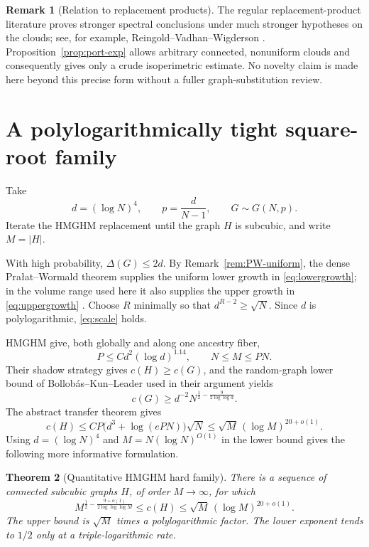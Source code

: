 \documentclass[11pt]{amsart}
\newtheorem{theorem}{Theorem}[section]
\theoremstyle{definition}
\newtheorem{remark}[theorem]{Remark}
\newcommand{\cnum}{c}
\begin{document}
\begin{remark}[Relation to replacement products]
The regular replacement-product literature proves stronger spectral
conclusions under much stronger hypotheses on the clouds; see, for example,
Reingold--Vadhan--Wigderson \cite{RVW}.  Proposition~\ref{prop:port-exp} allows arbitrary
connected, nonuniform clouds and consequently gives only a crude
isoperimetric estimate.  No novelty claim is made here beyond this precise
form without a fuller graph-substitution review.
\end{remark}

\section{A polylogarithmically tight square-root family}

Take
\[
 d=(\log N)^4,
 \qquad
 p=\frac{d}{N-1},
 \qquad
 G\sim G(N,p).
\]
Iterate the HMGHM replacement until the graph $H$ is subcubic, and write
$M=|H|$.

With high probability, $\Delta(G)\le2d$.  By
Remark~\ref{rem:PW-uniform}, the dense Pra{\l}at--Wormald theorem supplies the
uniform lower growth in \eqref{eq:lowergrowth}; in the volume range used here
it also supplies the upper growth in \eqref{eq:uppergrowth} \cite{PW}.  Choose
$R$ minimally so that $d^{R-2}\ge\sqrt N$.  Since $d$ is polylogarithmic,
\eqref{eq:scale} holds.

HMGHM give, both globally and along one ancestry fiber,
\begin{equation}\label{eq:Pbound}
 P\le C d^2(\log d)^{1.14},
 \qquad
 N\le M\le PN.
\end{equation}
Their shadow strategy gives $\cnum(H)\ge\cnum(G)$, and the random-graph lower
bound of Bollob\'as--Kun--Leader used in their argument yields
\[
 \cnum(G)
 \ge
 d^{-2}N^{\frac12-\frac{9}{2\log\log d}}.
\]
The abstract transfer theorem gives
\[
 \cnum(H)
 \le
 CP\bigl(d^3+\log(ePN)\bigr)\sqrt N
 \le
 \sqrt M\,(\log M)^{20+o(1)}.
\]
Using $d=(\log N)^4$ and $M=N(\log N)^{O(1)}$ in the lower bound gives the
following more informative formulation.

\begin{theorem}[Quantitative HMGHM hard family]\label{thm:hardfamily}
There is a sequence of connected subcubic graphs $H$, of order $M\to\infty$,
for which
\[
 \boxed{
 M^{\frac12-\frac{9+o(1)}{2\log\log\log M}}
 \le
 \cnum(H)
 \le
 \sqrt M\,(\log M)^{20+o(1)}.
 }
\]
The upper bound is $\sqrt M$ times a polylogarithmic factor.  The lower
exponent tends to $1/2$ only at a triple-logarithmic rate.
\end{theorem}
\end{document}
